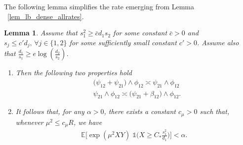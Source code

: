 \documentclass{article}
\newcommand{\EE}{\mathbb{E}}
\newcommand{\one}{\mathds{1}}
\newcommand{\Ct}{C_{*}}
\newtheorem{lemma}{Lemma}
\theoremstyle{remark}
\begin{document}
The following lemma simplifies the rate emerging from Lemma ~\ref{lem_lb_dense_allrates}.
\begin{lemma}\label{lem_simplify_dense_allrates}
    Assume that $s_1^2 \geq \bar c d_1 s_2$ for some constant $\bar c>0$ and $s_j \leq c' d_j, \,\forall j \in \{1,2\}$ for some sufficiently small constant $c'>0$. 
    Assume also that $\frac{d_1}{s_1} \geq e\log\left(\frac{d_2}{s_2}\right)$. 
    \begin{enumerate}
        \item 
        Then the following two properties hold    
    \begin{align}
        & \Big(\psi_{12} + \psi_{21}\Big) \land \phi_{12}
        \asymp \psi_{21} \land \phi_{12}\label{eq_simplification_dense_case}\\
        & \psi_{21} \land \phi_{12}
        \asymp \Big(\psi_{21} + \beta_{12}\Big) \land \phi_{12}.\label{eq_simplification_dense_case_upper_bound}
    \end{align}
    \item
    It follows that, for any $\alpha>0$, there exists a constant $c_\mu>0$ such that, whenever $\mu^2 \leq c_\mu R$, we have
    \begin{align*}
    \EE\Big[\exp(\mu^2XY)\; \one\Big(X \geq \Ct \frac{s_1^2}{d_1}\Big)\Big] < \alpha.
    \end{align*}
    \end{enumerate}
\end{lemma}
\end{document}
